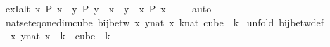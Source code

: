 \begin{isabellebody}
\begin{isamarkuptext}
\end{isamarkuptext}\isamarkuptrue%
\isamarkupfalse%
\ ex{}I{\isacharunderscore}{\kern0pt}alt{\isacharcolon}{\kern0pt}\ {\isachardoublequoteopen}{\isacharparenleft}{\kern0pt}{\isasymexists}x{\isachardot}{\kern0pt}\ P\ x\ {\isasymand}\ {\isacharparenleft}{\kern0pt}{\isasymforall}y{\isachardot}{\kern0pt}\ P\ y\ {\isasymlongrightarrow}\ x\ {\isacharequal}{\kern0pt}\ y{\isacharparenright}{\kern0pt}{\isacharparenright}{\kern0pt}\ {\isasymLongrightarrow}\ {\isacharparenleft}{\kern0pt}{\isasymexists}{\isacharbang}{\kern0pt}x{\isachardot}{\kern0pt}\ P\ x{\isacharparenright}{\kern0pt}{\isachardoublequoteclose}\ \isanewline
%
\isadelimproof
\ \ %
\endisadelimproof
%
\isatagproof
{}\isamarkupfalse%
\ auto%
\endisatagproof
{\isafoldproof}%
%
\isadelimproof
\isanewline
%
\endisadelimproof
{}\isamarkupfalse%
\ nat{\isacharunderscore}{\kern0pt}set{\isacharunderscore}{\kern0pt}eq{\isacharunderscore}{\kern0pt}one{\isacharunderscore}{\kern0pt}dim{\isacharunderscore}{\kern0pt}cube{\isacharcolon}{\kern0pt}\ {\isachardoublequoteopen}bij{\isacharunderscore}{\kern0pt}betw\ {\isacharparenleft}{\kern0pt}{\isasymlambda}x{\isachardot}{\kern0pt}\ {\isasymlambda}y{\isasymin}{\isacharbraceleft}{\kern0pt}{\isachardot}{\kern0pt}{\isachardot}{\kern0pt}{\isacharless}{\kern0pt}{}{\isacharcolon}{\kern0pt}{\isacharcolon}{\kern0pt}nat{\isacharbraceright}{\kern0pt}{\isachardot}{\kern0pt}\ x{\isacharparenright}{\kern0pt}\ {\isacharbraceleft}{\kern0pt}{\isachardot}{\kern0pt}{\isachardot}{\kern0pt}{\isacharless}{\kern0pt}k{\isacharcolon}{\kern0pt}{\isacharcolon}{\kern0pt}nat{\isacharbraceright}{\kern0pt}\ {\isacharparenleft}{\kern0pt}cube\ {}\ k{\isacharparenright}{\kern0pt}{\isachardoublequoteclose}\isanewline
%
\isadelimproof
%
\endisadelimproof
%
\isatagproof
{}\isamarkupfalse%
\ {\isacharparenleft}{\kern0pt}unfold\ bij{\isacharunderscore}{\kern0pt}betw{\isacharunderscore}{\kern0pt}def{\isacharparenright}{\kern0pt}\isanewline
\ \ \isamarkupfalse%
\ {\isacharasterisk}{\kern0pt}{\isacharcolon}{\kern0pt}\ {\isachardoublequoteopen}{\isacharparenleft}{\kern0pt}{\isasymlambda}x{\isachardot}{\kern0pt}\ {\isasymlambda}y{\isasymin}{\isacharbraceleft}{\kern0pt}{\isachardot}{\kern0pt}{\isachardot}{\kern0pt}{\isacharless}{\kern0pt}{}{\isacharcolon}{\kern0pt}{\isacharcolon}{\kern0pt}nat{\isacharbraceright}{\kern0pt}{\isachardot}{\kern0pt}\ x{\isacharparenright}{\kern0pt}\ {\isacharbackquote}{\kern0pt}\ {\isacharbraceleft}{\kern0pt}{\isachardot}{\kern0pt}{\isachardot}{\kern0pt}{\isacharless}{\kern0pt}k{\isacharbraceright}{\kern0pt}\ {\isacharequal}{\kern0pt}\ cube\ {}\ k{\isachardoublequoteclose}\isanewline

\end{isabellebody}
